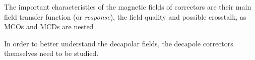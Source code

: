 The important characteristics of the magnetic fields of correctors are their main field transfer
function (or \textit{response}), the field quality and possible crosstalk, as MCOs and MCDs are
nested~\cite{venturini_delsolaro_magnetic_2005}.

In order to better understand the decapolar fields, the decapole correctors themselves need to be
studied.















